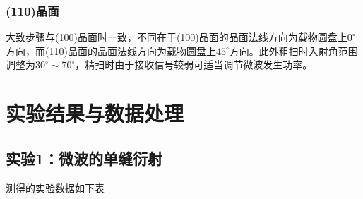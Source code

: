\documentclass[UTF-8,twoside,cs4size]{ctexart}
\begin{document}
	\subsubsection{(110)晶面}
	大致步骤与(100)晶面时一致，不同在于(100)晶面的晶面法线方向为载物圆盘上$ 0^\circ $方向，而(110)晶面的晶面法线方向为载物圆盘上$ 45^\circ $方向。此外粗扫时入射角范围调整为$ 30^\circ\sim70^\circ $，精扫时由于接收信号较弱可适当调节微波发生功率。
	
	\section{实验结果与数据处理}
	\subsection{实验1：微波的单缝衍射}
	测得的实验数据如下表
\end{document}
